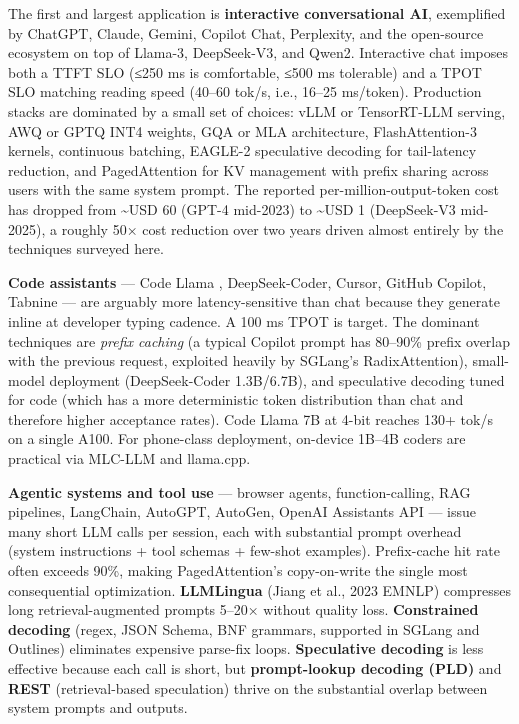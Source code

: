 \documentclass{article}
\begin{document}
The first and largest application is \textbf{interactive conversational AI}, exemplified by ChatGPT, Claude, Gemini, Copilot Chat, Perplexity, and the open-source ecosystem on top of Llama-3, DeepSeek-V3, and Qwen2. Interactive chat imposes both a TTFT SLO (≤250 ms is comfortable, ≤500 ms tolerable) and a TPOT SLO matching reading speed (40--60 tok/s, i.e., 16--25 ms/token). Production stacks are dominated by a small set of choices: vLLM or TensorRT-LLM serving, AWQ or GPTQ INT4 weights, GQA or MLA architecture, FlashAttention-3 kernels, continuous batching, EAGLE-2 speculative decoding for tail-latency reduction, and PagedAttention for KV management with prefix sharing across users with the same system prompt. The reported per-million-output-token cost has dropped from \textasciitilde USD 60 (GPT-4 mid-2023) to \textasciitilde USD 1 (DeepSeek-V3 mid-2025), a roughly 50× cost reduction over two years driven almost entirely by the techniques surveyed here.

\textbf{Code assistants} --- Code Llama \citep{rozire20232023}, DeepSeek-Coder, Cursor, GitHub Copilot, Tabnine --- are arguably more latency-sensitive than chat because they generate inline at developer typing cadence. A 100 ms TPOT is target. The dominant techniques are \emph{prefix caching} (a typical Copilot prompt has 80--90\% prefix overlap with the previous request, exploited heavily by SGLang's RadixAttention), small-model deployment (DeepSeek-Coder 1.3B/6.7B), and speculative decoding tuned for code (which has a more deterministic token distribution than chat and therefore higher acceptance rates). Code Llama 7B at 4-bit reaches 130+ tok/s on a single A100. For phone-class deployment, on-device 1B--4B coders are practical via MLC-LLM and llama.cpp.

\textbf{Agentic systems and tool use} --- browser agents, function-calling, RAG pipelines, LangChain, AutoGPT, AutoGen, OpenAI Assistants API --- issue many short LLM calls per session, each with substantial prompt overhead (system instructions + tool schemas + few-shot examples). Prefix-cache hit rate often exceeds 90\%, making PagedAttention's copy-on-write the single most consequential optimization. \textbf{LLMLingua} (Jiang et al., 2023 EMNLP) compresses long retrieval-augmented prompts 5--20× without quality loss. \textbf{Constrained decoding} (regex, JSON Schema, BNF grammars, supported in SGLang and Outlines) eliminates expensive parse-fix loops. \textbf{Speculative decoding} is less effective because each call is short, but \textbf{prompt-lookup decoding (PLD)} and \textbf{REST} (retrieval-based speculation) thrive on the substantial overlap between system prompts and outputs.
\end{document}
